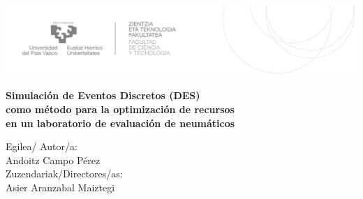 
\begin{titlepage}
\hspace*{-3.5cm}
    \begin{minipage}{\textwidth}
        \vspace{-2.5cm}
        \begin{center}
    

            \includegraphics[width=\paperwidth]{fig/LogoEHU.PNG}
        \end{center}
    \end{minipage}

\vspace{1cm}

\hspace{-3.1cm}
\noindent{}

\vspace{0.8cm}

\noindent\hspace*{-3.5cm}%
\colorbox{light-gray}{\begin{minipage}{\paperwidth}%

    \vspace{1cm}

    \color{RoyalBlue}
	\begin{center}
    \centering\Large\textbf{ Simulación de Eventos Discretos (DES)\\
	como método para la optimización de recursos \\
	en un laboratorio de evaluación de neumáticos}


	\end{center}
    \vspace{1.0cm}\mbox{}
  \end{minipage}
}

\begin{flushright}
 Egilea/ Autor/a:
\\
Andoitz Campo Pérez
\\
Zuzendariak/Directores/as:
\\
Asier Aranzabal Maiztegi
\\
\end{flushright}


\end{titlepage}
